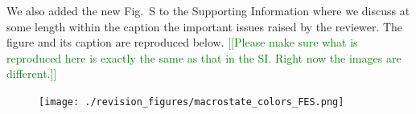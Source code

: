 \documentclass[11pt,a4paper]{letter} %
\newcommand*{\rood}[1]{{\color{red}{#1}}}
\newcommand*{\noteg}[1]{\textcolor{green}{[[#1]]}}		%
\newcommand*{\noter}[1]{{\color{red}{[[#1]]}}}
\begin{document}
We also added the new Fig.~S\rood{X} to the Supporting Information where we discuss at some length within the caption the important issues raised by the reviewer. The figure and its caption are reproduced below. \noteg{Please make sure what is reproduced here is exactly the same as that in the SI. Right now the images are different.}



\begin{figure}[ht!]
	\begin{center}
        \texttt{[image: ./revision\_figures/macrostate\_colors\_FES.png]}
        \label{fig:macrostate_colors_FES}
	\end{center}
\end{figure}
\clearpage
\end{document}
